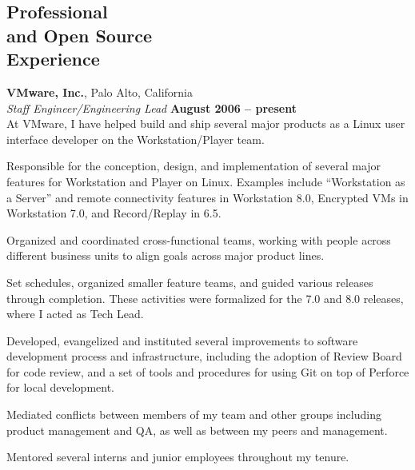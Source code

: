 \documentclass[margin,line]{resume}
\begin{document}
\begin{resume}
    \section{\mysidestyle Professional\\and Open Source\\Experience}
    {\bf VMware, Inc.}, Palo Alto, California \vspace{2mm}\\\vspace{1mm}%
    {\sl Staff Engineer/Engineering Lead} \hfill {\bf August 2006 -- present}\\
    At VMware, I have helped build and ship several major products as a Linux
    user interface developer on the Workstation/Player team.
    \vspace{3mm}
    \begin{list2}
    \item Responsible for the conception, design, and implementation of several
          major features for Workstation and Player on Linux. Examples include
          ``Workstation as a Server'' and remote connectivity features in
          Workstation 8.0, Encrypted VMs in Workstation 7.0, and Record/Replay
          in 6.5.
    \item Organized and coordinated cross-functional teams, working with people
          across different business units to align goals across major product
          lines.
    \item Set schedules, organized smaller feature teams, and guided various
          releases through completion. These activities were formalized for the
          7.0 and 8.0 releases, where I acted as Tech Lead.
    \item Developed, evangelized and instituted several improvements to software
          development process and infrastructure, including the adoption of
          Review Board for code review, and a set of tools and procedures for
          using Git on top of Perforce for local development.
    \item Mediated conflicts between members of my team and other groups
          including product management and QA, as well as between my peers and
          management.
    \item Mentored several interns and junior employees throughout my tenure.
    \end{list2}


\end{resume}
\end{document}
